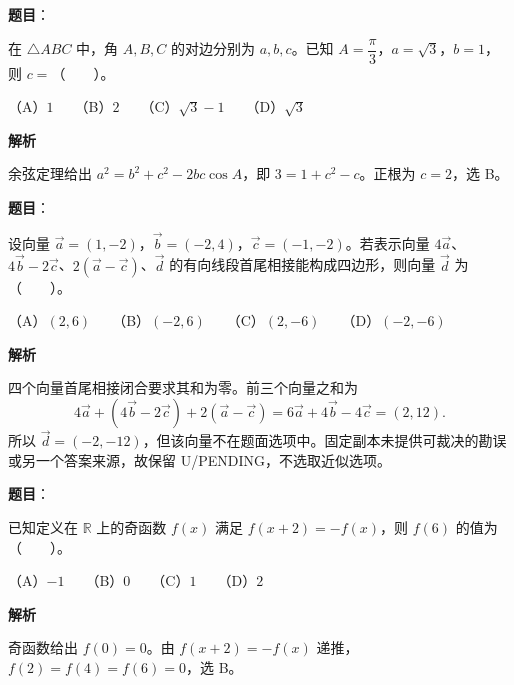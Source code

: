 \begin{answer}

\textbf{题目}：

在 $\triangle ABC$ 中，角 $A,B,C$ 的对边分别为 $a,b,c$。已知 $A=\dfrac{\pi}{3}$，$a=\sqrt3$，$b=1$，则 $c=$\mbox{（　　）}。

（A）$1$　　（B）$2$　　（C）$\sqrt3-1$　　（D）$\sqrt3$

\textbf{解析}

余弦定理给出 $a^2=b^2+c^2-2bc\cos A$，即 $3=1+c^2-c$。正根为 $c=2$，选 B。


\end{answer}
\begin{answer}

\textbf{题目}：

设向量 $\vec a=(1,-2)$，$\vec b=(-2,4)$，$\vec c=(-1,-2)$。若表示向量 $4\vec a$、$4\vec b-2\vec c$、$2(\vec a-\vec c)$、$\vec d$ 的有向线段首尾相接能构成四边形，则向量 $\vec d$ 为\mbox{（　　）}。

（A）$(2,6)$　　（B）$(-2,6)$　　（C）$(2,-6)$　　（D）$(-2,-6)$

\textbf{解析}

四个向量首尾相接闭合要求其和为零。前三个向量之和为
\nopagebreak[4]
\[
4\vec a+(4\vec b-2\vec c)+2(\vec a-\vec c)
=6\vec a+4\vec b-4\vec c
=(2,12).
\]
所以 $\vec d=(-2,-12)$，但该向量不在题面选项中。固定副本未提供可裁决的勘误或另一个答案来源，故保留 U/PENDING，不选取近似选项。


\end{answer}
\begin{answer}

\textbf{题目}：

已知定义在 $\mathbb R$ 上的奇函数 $f(x)$ 满足 $f(x+2)=-f(x)$，则 $f(6)$ 的值为\mbox{（　　）}。

（A）$-1$　　（B）$0$　　（C）$1$　　（D）$2$

\textbf{解析}

奇函数给出 $f(0)=0$。由 $f(x+2)=-f(x)$ 递推，$f(2)=f(4)=f(6)=0$，选 B。


\end{answer}
